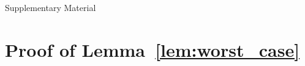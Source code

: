 \documentclass[twoside]{article} \usepackage{aistats2017}
\begin{document}
\clearpage
\appendix

\begin{center}
{\Large Supplementary Material}
\end{center}

\section{Proof of Lemma~\ref{lem:worst_case}}\label{app:worst_case_proof}

\end{document}
